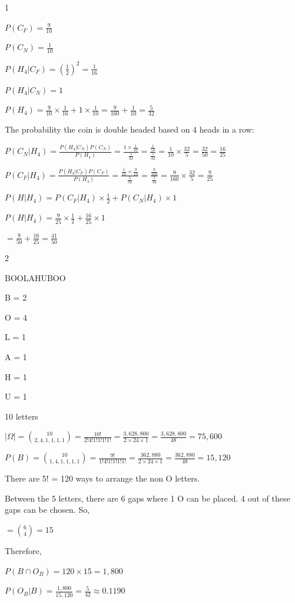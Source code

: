 \documentclass[12 pt]{article}
\begin{document}
    \begin{exercise}{1}
    \hfill

    $P(C_F) = \frac{9}{10}$
    
    $P(C_N) = \frac{1}{10}$

    $P(H_4 | C_F) = (\frac{1}{2})^2 = \frac{1}{16}$

    $P(H_4 | C_N) = 1$

    $P(H_4) = \frac{9}{10} \times \frac{1}{16} + 1 \times \frac{1}{10} = \frac{9}{160} + \frac{1}{10} = \frac{5}{32}$

    The probability the coin is double headed based on 4 heads in a row:

    $P(C_N | H_4) = \frac{P(H_4 | C_N)P(C_N)}{P(H_4)} = \frac{1 \times \frac{1}{10}}{\frac{5}{32}} = \frac{\frac{1}{10}}{\frac{5}{32}} = \frac{1}{10} \times \frac{32}{5} = \frac{32}{50} = \frac{16}{25}$

    $P(C_F | H_4) = \frac{P(H_4 | C_F)P(C_F)}{P(H_4)} = \frac{\frac{1}{16 } \times \frac{9}{10}}{\frac{5}{32}} = \frac{\frac{9}{160}}{\frac{5}{32}} = \frac{9}{160} \times \frac{32}{5} = \frac{9}{25}$

    $P(H | H_4) = P(C_F | H_4) \times \frac{1}{2} + P(C_N | H_4) \times 1$

    $P(H | H_4) = \frac{9}{25} \times \frac{1}{2} + \frac{16}{25} \times 1$

    $= \frac{9}{50} + \frac{16}{25} = \frac{41}{50}$
    \end{exercise}

    

    \begin{exercise}{2}
    \hfill

    BOOLAHUBOO

    B = 2

    O = 4

    L = 1

    A = 1

    H = 1

    U = 1

    10 letters

    $|\Omega | = \binom{10}{2, 4, 1, 1, 1, 1} = \frac{10!}{2!4!1!1!1!1!} = \frac{3,628,800}{2 \times 24 \times 1} = \frac{3,628,800}{48} = 75,600$

    $P(B) = \binom{10}{1, 4, 1, 1, 1, 1} = \frac{9!}{1!4!1!1!1!1!} = \frac{362,880}{2 \times 24 \times 1} = \frac{362,880}{48} = 15,120$

    There are 5! = 120 ways to arrange the non O letters.

    Between the 5 letters, there are 6 gaps where 1 O can be placed. 4 out of these gaps can be chosen. So,

    $= \binom{6}{4} = 15$

    Therefore,

    $P(B \cap O_B) = 120 \times 15 = 1,800$

    $P(O_B | B) = \frac{1,800}{15,120} = \frac{5}{42} \approx 0.1190$
    \end{exercise}
\end{document}
